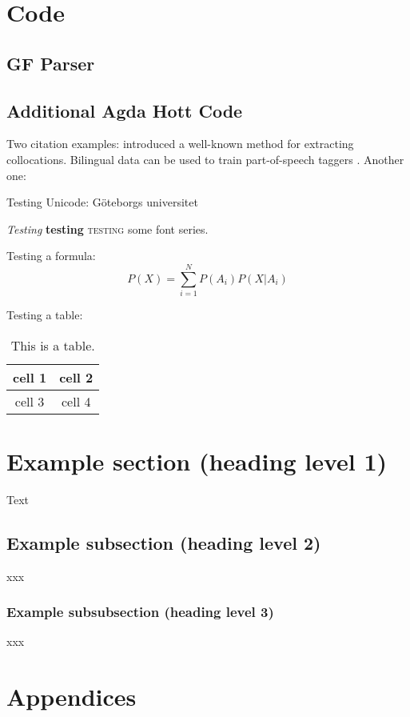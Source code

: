 \documentclass[11pt, a4paper]{article}
\begin{document}
\section{Code}

\subsection{GF Parser}

\subsection{Additional Agda Hott Code}

Two citation examples: 
\cite{dunning1993} introduced a well-known method for extracting
collocations. Bilingual data can be used to train part-of-speech
taggers \citep{das2011}. Another one: \citep{cortes2014}

Testing Unicode: Göteborgs universitet

\textit{Testing} \textbf{testing} \textsc{testing} some font series.

Testing a formula:
\[
P(X) = \sum_{i=1}^N P(A_i) P(X|A_i)
\]

Testing a table:
\begin{table}[htbp]
\begin{center}
\begin{tabular}{c|c}
cell 1 & cell 2 \\
\hline
cell 3 & cell 4
\end{tabular}
\caption{This is a table.}
\end{center}
\end{table}

\newpage

\section{Example section (heading level 1)}

Text

\subsection{Example subsection (heading level 2)}

xxx

\subsubsection{Example subsubsection (heading level 3)}

xxx

\newpage





\newpage
\section{Appendices}
\end{document}
